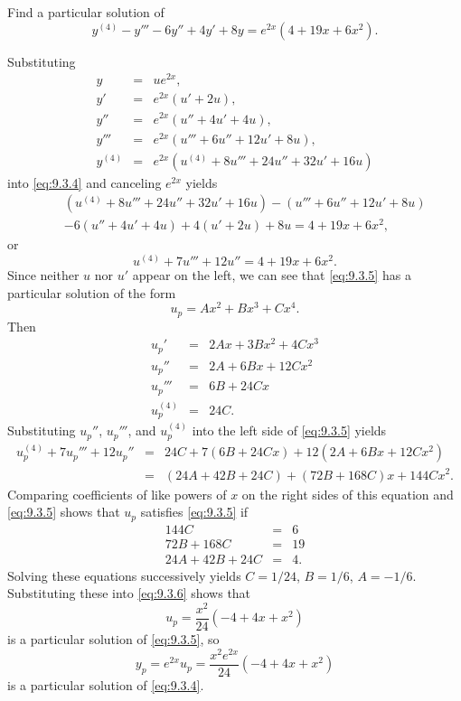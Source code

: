 \documentclass{ximera}
\begin{document}
\begin{example}\label{example:9.3.2}
Find a particular solution of
\begin{equation} \label{eq:9.3.4}
y^{(4)}-y'''-6y''+4y'+8y=e^{2x}(4+19x+6x^2).
\end{equation}

\begin{explanation}
Substituting
\begin{eqnarray*}
y&=&ue^{2x},\\ y'&=&e^{2x}(u'+2u),\\
y''&=&e^{2x}(u''+4u'+4u),\\
y'''&=&e^{2x}(u'''+6u''+12u'+8u),\\
y^{(4)}&=&e^{2x}(u^{(4)}+8u'''+24u''+32u'+16u)
\end{eqnarray*}
into \eqref{eq:9.3.4} and canceling $e^{2x}$ yields
\begin{eqnarray*}
&&(u^{(4)}+8u'''+24u''+32u'+16u)-(u'''+6u''+12u'+8u)\\
&&-6(u''+4u'+4u)+4(u'+2u)+8u=4+19x+6x^2,
\end{eqnarray*}
or
\begin{equation} \label{eq:9.3.5}
u^{(4)}+7u'''+12u''=4+19x+6x^2.
\end{equation}
Since neither $u$ nor $u'$ appear on the left, we can see that
\eqref{eq:9.3.5} has a particular solution of the form
\begin{equation} \label{eq:9.3.6}
u_p=Ax^2+Bx^3+Cx^4.
\end{equation}
Then
\begin{eqnarray*}
u_p'&=&2Ax+3Bx^2+4Cx^3\\
u_p''&=&2A+6Bx+12Cx^2\\
u_p'''&=&6B+24Cx\\
u_p^{(4)}&=&24C.
\end{eqnarray*}
Substituting $u_p''$, $u_p'''$, and $u_p^{(4)}$  into the left side of
\eqref{eq:9.3.5} yields
\begin{eqnarray*}
u_p^{(4)}+7u_p'''+12u_p''&=&24C+7(6B+24Cx)+12(2A+6Bx+12Cx^2)\\
&=&(24A+42B+24C)+(72B+168C)x+144Cx^2.
\end{eqnarray*}
Comparing coefficients of like powers of $x$ on the right sides of
this equation and \eqref{eq:9.3.5} shows that $u_p$ satisfies \eqref{eq:9.3.5}
if
$$
\begin{array}{rcr}
144C&=&6\\
72B+168C&=&19\\
24A+42B+24C&=&4.
\end{array}
$$
Solving these equations successively yields $C=1/24$, $B=1/6$, $A=-1/6$.
Substituting these into \eqref{eq:9.3.6} shows that
$$
u_p=\frac{x^2}{24}(-4+4x+x^2)
$$
is a particular solution of  \eqref{eq:9.3.5}, so
$$
y_p=e^{2x}u_p=\frac{x^2e^{2x}}{24}(-4+4x+x^2)
$$
is a particular solution of  \eqref{eq:9.3.4}.


\end{explanation}
\end{example}
\end{document}
